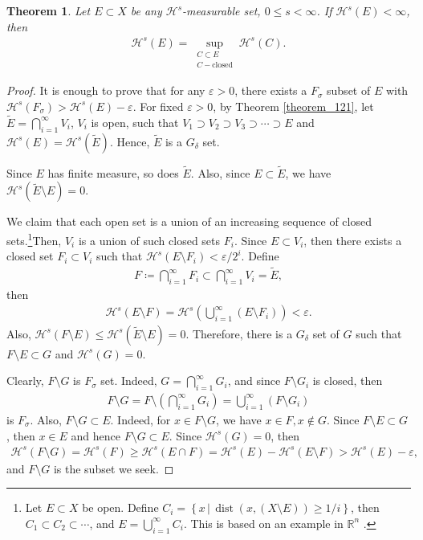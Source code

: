 \documentclass[11pt]{book}
\newtheorem{theorem}{Theorem}[chapter]
\theoremstyle{definition}
\numberwithin{equation}{chapter}
\def\H{{\mathcal H}}
\begin{document}
\begin{theorem}
Let $E \subset X$ be any $\H^s$-measurable set, $0 \leq s < \infty$. If $\H^s(E) < \infty$, then \begin{align*}
    \H^s(E) = \sup_{\substack{C \subset E\\ C - \text{closed}}} \H^s(C).
\end{align*}
\end{theorem}
\begin{proof}
It is enough to prove that for any $\varepsilon > 0$, there exists a $F_\sigma$ subset of $E$ with $\H^s(F_\sigma) > \H^s(E) - \varepsilon$. For fixed $\varepsilon > 0$, by Theorem \ref{theorem_121}, let $\widetilde{E} = \bigcap^\infty_{i=1} V_i$, $V_i$ is open, such that $V_1 \supset V_2 \supset V_3 \supset \cdots \supset E$ and $\H^s(E) = \H^s(\widetilde{E})$. Hence, $\widetilde{E}$ is a $G_\delta$ set.

Since $E$ has finite measure, so does $\widetilde{E}$. Also, since $E \subset \widetilde{E}$, we have $\H^s(\widetilde{E} \setminus E) = 0$. 

We claim that each open set is a union of an increasing sequence of closed sets.\footnote{Let $E \subset X$ be open. Define $C_i = \left\{x \,|\, \operatorname{dist}(x, (X\setminus E)) \geq 1/i\right\}$, then $C_1 \subset C_2 \subset \cdots$, and $E = \bigcup^\infty_{i=1}C_i$. This is based on an example in $\mathbb{R}^n$ \cite{15}.}Then, $V_i$ is a union of such closed sets $F_i$. Since $E \subset V_i$, then there exists a closed set $F_i \subset V_i$ such that $\H^s(E \setminus F_i) < \varepsilon / 2^i$. Define
\begin{align*}
    F \coloneqq \bigcap^\infty_{i=1} F_i \subset \bigcap^\infty_{i=1} V_i = \widetilde{E},
\end{align*}
then
\begin{align*}
    \H^s(E \setminus F) = \H^s \left(\bigcup^\infty_{i=1} (E \setminus F_i)\right) < \varepsilon.
\end{align*}
Also, $\H^s(F \setminus E) \leq \H^s(\widetilde{E} \setminus E) = 0$. Therefore, there is a $G_\delta$ set of $G$ such that $F \setminus E \subset G$ and $\H^s(G) = 0$. 

Clearly, $F \setminus G$ is $F_\sigma$ set. Indeed, $G = \bigcap^\infty_{i=1} G_i$, and since $F \setminus G_i$ is closed, then
\begin{align*}
    F \setminus G = F \setminus \left(\bigcap^\infty_{i=1} G_i\right) = \bigcup^\infty_{i=1} (F \setminus G_i)
\end{align*}
is $F_\sigma$. Also, $F \setminus G \subset E$. Indeed, for $x \in F \setminus G$, we have $x \in F, x \notin G$. Since $F \setminus E \subset G$, then $x \in E$ and hence $F \setminus G \subset E$. Since $\H^s(G) = 0$, then 
\begin{align*}
    \H^s(F \setminus G) = \H^s(F) \geq \H^s(E \cap F) = \H^s(E) - \H^s(E \setminus F) > \H^s(E) - \varepsilon,
\end{align*}
and $F \setminus G$ is the subset we seek.
\end{proof}
\end{document}
